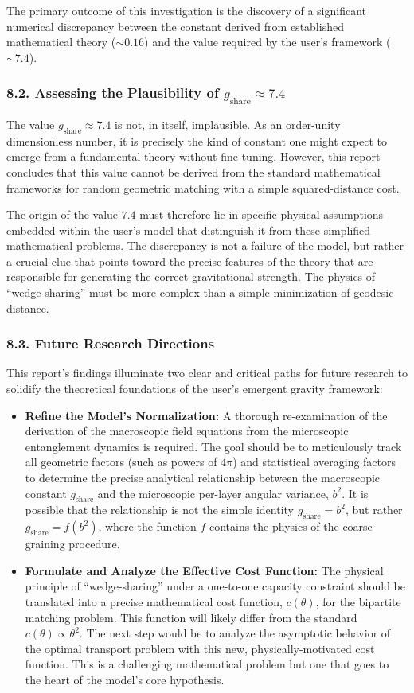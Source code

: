 \documentclass[11pt]{article}
\begin{document}
The primary outcome of this investigation is the discovery of a significant numerical discrepancy between the constant derived from established mathematical theory ($\sim 0.16$) and the value required by the user’s framework ($\sim 7.4$).

\subsubsection*{8.2. Assessing the Plausibility of $g_{\mathrm{share}} \approx 7.4$}
The value $g_{\mathrm{share}} \approx 7.4$ is not, in itself, implausible. As an order-unity dimensionless number, it is precisely the kind of constant one might expect to emerge from a fundamental theory without fine-tuning. However, this report concludes that this value cannot be derived from the standard mathematical frameworks for random geometric matching with a simple squared-distance cost.

The origin of the value $7.4$ must therefore lie in specific physical assumptions embedded within the user’s model that distinguish it from these simplified mathematical problems. The discrepancy is not a failure of the model, but rather a crucial clue that points toward the precise features of the theory that are responsible for generating the correct gravitational strength. The physics of “wedge-sharing” must be more complex than a simple minimization of geodesic distance.

\subsubsection*{8.3. Future Research Directions}
This report’s findings illuminate two clear and critical paths for future research to solidify the theoretical foundations of the user’s emergent gravity framework:
\begin{itemize}
  \item \textbf{Refine the Model’s Normalization:} A thorough re-examination of the derivation of the macroscopic field equations from the microscopic entanglement dynamics is required. The goal should be to meticulously track all geometric factors (such as powers of $4\pi$) and statistical averaging factors to determine the precise analytical relationship between the macroscopic constant $g_{\mathrm{share}}$ and the microscopic per-layer angular variance, $b^2$. It is possible that the relationship is not the simple identity $g_{\mathrm{share}} = b^2$, but rather $g_{\mathrm{share}} = f(b^2)$, where the function $f$ contains the physics of the coarse-graining procedure.
  \item \textbf{Formulate and Analyze the Effective Cost Function:} The physical principle of “wedge-sharing” under a one-to-one capacity constraint should be translated into a precise mathematical cost function, $c(\theta)$, for the bipartite matching problem. This function will likely differ from the standard $c(\theta) \propto \theta^2$. The next step would be to analyze the asymptotic behavior of the optimal transport problem with this new, physically-motivated cost function. This is a challenging mathematical problem but one that goes to the heart of the model’s core hypothesis.
\end{itemize}
\end{document}
